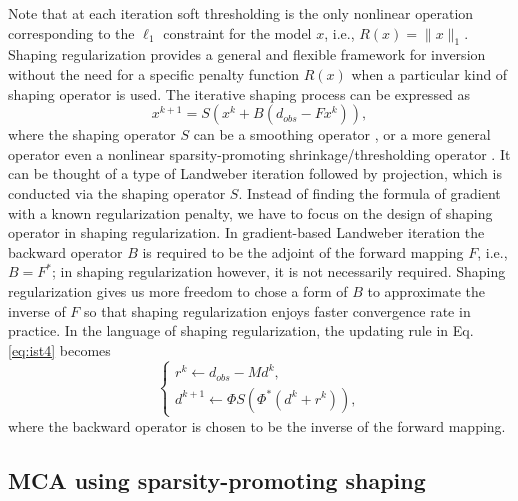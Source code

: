 Note that at each iteration soft thresholding is the only nonlinear operation corresponding to the $\ell_1$ constraint for the model $x$, i.e., $R(x)=\|x\|_1$.
 Shaping regularization \citep{fomel2007shaping,fomel2008nonlinear} provides a general and flexible framework for inversion without the need for a specific penalty function $R(x)$ when a particular kind of shaping operator is used. The iterative shaping process can be expressed as
 \begin{equation}\label{eq:shaping1}
   x^{k+1}=S(x^{k}+B(d_{obs}-Fx^{k})),
 \end{equation}
where the shaping operator $S$ can be a smoothing operator \citep{fomel2007shaping}, or a more general operator even  a nonlinear sparsity-promoting shrinkage/thresholding operator \citep{fomel2008nonlinear}. It can be thought of a type of Landweber iteration followed by projection, which is conducted via the shaping operator $S$. Instead of finding the formula of gradient with a known  regularization penalty, we have to focus on the design of shaping operator in shaping regularization. In gradient-based Landweber iteration the backward operator $B$ is required to be the adjoint of the forward mapping $F$, i.e., $B=F^*$; in shaping regularization however, it is not necessarily required. Shaping regularization gives us more freedom to chose a form of $B$ to approximate the inverse of $F$ so that shaping regularization enjoys faster convergence rate in practice. In the language of shaping regularization, the updating rule in Eq. \eqref{eq:ist4} becomes
\begin{equation}\label{eq:shaping2}
  \left\{
  \begin{array}{l}
    r^{k}\leftarrow d_{obs}-Md^{k}, \\
    d^{k+1}\leftarrow \Phi S(\Phi^{*}(d^{k}+r^{k})),
  \end{array}
  \right.
\end{equation}
where the backward operator is chosen to be the inverse of the forward mapping.

 
\subsection{MCA using sparsity-promoting shaping}

